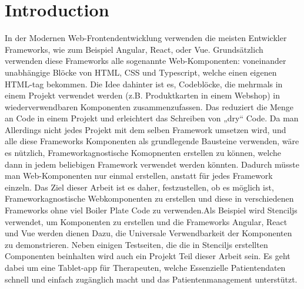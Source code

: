 \chapter{Introduction}
\label{cha:Introduction}
In der Modernen Web-Frontendentwicklung verwenden die meisten Entwickler Frameworks, wie zum Beispiel Angular, React, oder Vue. Grundsätzlich verwenden diese Frameworks alle sogenannte Web-Komponenten:  voneinander unabhängige Blöcke von HTML, CSS und Typescript, welche einen eigenen HTML-tag bekommen. Die Idee dahinter ist es, Codeblöcke, die mehrmals in einem Projekt verwendet werden (z.B. Produktkarten in einem Webshop) in wiederverwendbaren Komponenten zusammenzufassen. Das reduziert die Menge an Code in einem Projekt und erleichtert das Schreiben von „dry“ Code.
Da man Allerdings nicht jedes Projekt mit dem selben Framework umsetzen wird, und alle diese Frameworks Komponenten als grundlegende Bausteine verwenden, wäre es nützlich, Frameworkagnostische Komopnenten erstellen zu können, welche dann in jedem beliebigen Framework verwendet werden könnten. Dadurch müsste man Web-Komponenten nur einmal erstellen, anstatt für jedes Framework einzeln.
Das Ziel dieser Arbeit ist es daher, festzustellen, ob es möglich ist, Frameworkagnostische Webkomponenten zu erstellen und diese in verschiedenen Frameworks ohne viel Boiler Plate Code zu verwenden.Als Beispiel wird Stenciljs verwendet, um Komponenten zu erstellen und die Frameworks Angular, React und Vue werden dienen Dazu, die Universale Verwendbarkeit der Komponenten zu demonstrieren.
Neben einigen Testseiten, die die in Stenciljs erstellten Componenten beinhalten wird auch ein Projekt Teil dieser Arbeit sein. Es geht dabei um eine Tablet-app für Therapeuten, welche Essenzielle Patientendaten schnell und einfach zugänglich macht und das Patientenmanagement unterstützt.



